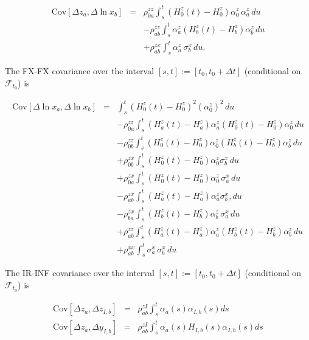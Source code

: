 \begin{eqnarray*}
      \mathrm{Cov} [\Delta z_a, \Delta \ln x_b] &=& \rho^{zz}_{0a}\int_s^t \left(H^z_0(t)-H^z_0\right)
  \alpha^z_0\,\alpha^z_a\,du \nonumber\\
      &&- \rho^{zz}_{ab}\int_s^t \alpha^z_a \left(H^z_b(t)-H^z_b\right) \alpha^z_b \,du \nonumber\\
      &&+\rho^{zx}_{ab}\int_s^t \alpha^z_a \, \sigma^x_b \,du.
\end{eqnarray*}

The FX-FX covariance over the interval $[s,t] := [t_0, t_0+\Delta t]$ (conditional on $\mathcal{F}_{t_0}$) is

\begin{eqnarray*}
      \mathrm{Cov}[\Delta \ln x_a, \Delta \ln x_b] &=&
      \int_s^t \left(H^z_0(t)-H^z_0\right)^2 (\alpha_0^z)^2\,du \nonumber\\
      && -\rho^{zz}_{0a} \int_s^t \left(H^z_a(t)-H^z_a\right) \alpha_a^z\left(H^z_0(t)-H^z_0\right) \alpha_0^z\,du
  \nonumber\\
      &&- \rho^{zz}_{0b}\int_s^t \left(H^z_0(t)-H^z_0\right)\alpha_0^z \left(H^z_b(t)-H^z_b\right)\alpha_b^z\,du
  \nonumber\\
      &&+ \rho^{zx}_{0b}\int_s^t \left(H^z_0(t)-H^z_0\right)\alpha_0^z \sigma^x_b\,du \nonumber\\
      &&+ \rho^{zx}_{0a}\int_s^t \left(H^z_0(t)-H^z_0\right)\alpha_0^z\,\sigma^x_a\,du \nonumber\\
      &&- \rho^{zx}_{ab}\int_s^t \left(H^z_a(t)-H^z_a\right)\alpha_a^z \sigma^x_b,du\nonumber\\
      &&- \rho^{zx}_{ba}\int_s^t \left(H^z_b(t)-H^z_b\right)\alpha_b^z\,\sigma^x_a\, du \nonumber\\
      &&+ \rho^{zz}_{ab}\int_s^t \left(H^z_a(t)-H^z_a\right)\alpha_a^z \left(H^z_b(t)-H^z_b\right)\alpha_b^z\,du
  \nonumber\\
      &&+ \rho^{xx}_{ab}\int_s^t\sigma^x_a\,\sigma^x_b \,du
\end{eqnarray*}

The IR-INF covariance over the interval $[s,t] := [t_0, t_0+\Delta t]$ (conditional on $\mathcal{F}_{t_0}$) is

\begin{eqnarray*}
  \mathrm{Cov}[ \Delta z_a, \Delta z_{I,b} ] & = & \rho_{ab}^{zI} \int_s^t \alpha_a(s) \alpha_{I,b}(s) ds \\
  \mathrm{Cov}[ \Delta z_a, \Delta y_{I,b} ] & = & \rho_{ab}^{zI} \int_s^t \alpha_a(s) H_{I,b}(s) \alpha_{I,b}(s) ds
\end{eqnarray*}

